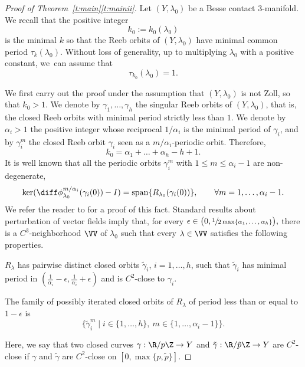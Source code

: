 \begin{proof}[Proof of Theorem~\ref{t:main}\eqref{t:mainii}]
Let $(Y,\lambda_0)$ be a Besse contact $3$-manifold. We recall that the positive integer\vspace*{-3pt}
\[
k_0:=k_0(\lambda_0)
\]
is the minimal $k$ so that the Reeb orbits of $(Y,\lambda_0)$ have minimal common period $\tau_k(\lambda_0)$. Without loss of generality, up to multiplying $\lambda_0$ with a positive constant, we~can assume that\vspace*{-3pt}
\[
\tau_{k_0}(\lambda_0)=1.
\]

We first carry out the proof under the assumption that $(Y,\lambda_0)$ is not Zoll, so that $k_0>1$. We denote by $\gamma_1,\dots,\gamma_h$ the singular Reeb orbits of $(Y,\lambda_0)$, that is, the closed Reeb orbits with minimal period strictly less than $1$.
We denote by $\alpha_i>1$ the positive integer whose reciprocal $1/\alpha_i$ is the minimal period of $\gamma_i$,
and by $\gamma_i^m$ the closed Reeb orbit $\gamma_i$ seen as a $m/\alpha_i$-periodic orbit. Therefore,\vspace*{-3pt}
\begin{equation}
\label{e:k_nonZoll}
k_0 = \alpha_1+\dots+\alpha_h - h + 1.
\end{equation}
It is well known that all the periodic orbits $\gamma_i^m$ with $1\leq m\leq \alpha_i-1$ are non-degenerate, \ie\vspace*{-3pt}
\[
\ker(\diff\phi_{\lambda_0}^{m/\alpha_i}(\gamma_i(0))-I)=\mathrm{span}\{R_{\lambda_0}(\gamma_i(0))\},\qquad\forall m=1,\dots,\alpha_i-1.
\]
We refer the reader to \cite[\S 4.1]{Cristofaro-Gardiner:2020aa} for a proof of this fact.
Standard results about perturbation of vector fields imply that, for every
$
\epsilon\in\big(0,\sfrac1{2\max\{\alpha_1,\dots,\alpha_h\}}\big),
$
there is a $C^3$-neighborhood $\VV$ of $\lambda_0$ such that every $\lambda\in\VV$ satisfies the following properties.

\begin{enumeratei}
\item\label{enum2:i}
$R_{\lambda}$ has pairwise distinct closed orbits $\tilde\gamma_i$, $i=1,\dots,h$, such that $\tilde{\gamma}_i$ has minimal period in $(\tfrac1{\alpha_i}-\epsilon,\tfrac1{\alpha_i}+\epsilon)$ and is $C^2$-close to $\gamma_i$.
\item\label{enum2:ii}
The family of possibly iterated closed orbits of $R_{\lambda}$ of period less than or equal to $1-\epsilon$ is
\[
\big\{ \tilde\gamma_i^m\mid i\in\{1,\dots,h\},\ m\in\{1,\dots,\alpha_i-1\} \big\}.
\]
\end{enumeratei}
Here, we say that two closed curves $\gamma:\R/p\Z \to Y$ and $\tilde{\gamma}:\R/\tilde{p} \Z \to Y$ are $C^2$-close if $\gamma$ and $\tilde{\gamma}$ are $C^2$-close on $[0,\max\{p,\tilde{p}\}]$.


\end{proof}
